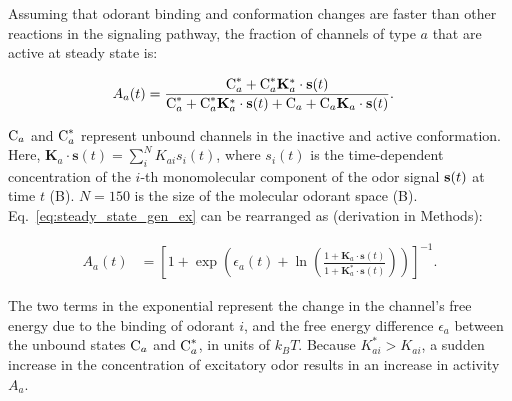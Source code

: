 \documentclass[9pt,lineno]{elife}
\begin{document}
Assuming that odorant binding and conformation changes are faster than other reactions in the signaling pathway, the fraction of channels of type $a$ that are active at steady state is:


\begin{align}
A_a(t) &= \frac{\textup{C}_a^* + \textup{C}_a^* \mathbf{K}^*_a\cdot\mathbf{s}(t)}{\textup{C}_a^* +\textup{C}_a^* \mathbf{K}^*_a\cdot\mathbf{s}(t) + \textup{C}_a +\textup{C}_a \mathbf{K}_a\cdot\mathbf{s}(t) }. 
\label{eq:steady_state_gen_ex}
\end{align}

$\textup{C}_a$ and $\textup{C}_a^*$ represent unbound channels in the inactive and active conformation. Here, $\mathbf{K}_a\cdot\mathbf{s}(t)=\sum_i^N K_{ai} s_i(t)$, where $s_i(t)$ is the time-dependent concentration of the $i$-th monomolecular component of the odor signal ${\bf s}(t)$ at time $t$ (B).  $N=150$ is the size of the molecular odorant space (B).
Eq.~\ref{eq:steady_state_gen_ex} can be rearranged as (derivation in Methods):

\begin{align}
A_a(t) &= \left[1 + \exp\left(\epsilon_a(t) + \ln\left(\frac{1 + \mathbf{K}_a\cdot\mathbf{s}(t)}{1 + \mathbf{K}^*_a\cdot\mathbf{s}(t)}\right)\right)\right]^{-1}. 
\label{eq:steady_state_act_OR}
\end{align}

The two terms in the exponential represent the change in the channel's free energy due to the binding of odorant $i$, and the free energy difference %
$\epsilon_a$ between the unbound states $\textup{C}_a$ and $\textup{C}_a^*$, %
in units of $k_B T$. Because $K^*_{ai} > K_{ai}$, a sudden increase in the concentration of excitatory odor results in an %
increase in activity $A_a$.
\end{document}
